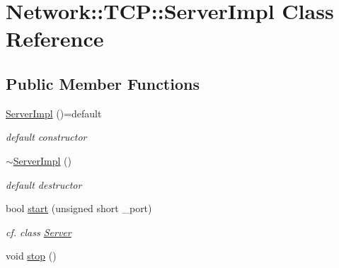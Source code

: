\hypertarget{class_network_1_1_t_c_p_1_1_server_impl}{}\section{Network\+:\+:T\+CP\+:\+:Server\+Impl Class Reference}
\label{class_network_1_1_t_c_p_1_1_server_impl}
\subsection*{Public Member Functions}
\begin{DoxyCompactItemize}
\item 
\mbox{\label{class_network_1_1_t_c_p_1_1_server_impl_a403326bc1862f1666931d7552e5d73dd}} 
\hyperlink{class_network_1_1_t_c_p_1_1_server_impl_a403326bc1862f1666931d7552e5d73dd}{Server\+Impl} ()=default
\begin{DoxyCompactList}\small\item\em default constructor \end{DoxyCompactList}\item 
\mbox{\label{class_network_1_1_t_c_p_1_1_server_impl_a5f24accaf0c35e6bca1944310d6d365b}} 
\hyperlink{class_network_1_1_t_c_p_1_1_server_impl_a5f24accaf0c35e6bca1944310d6d365b}{$\sim$\+Server\+Impl} ()
\begin{DoxyCompactList}\small\item\em default destructor \end{DoxyCompactList}\item 
\mbox{\label{class_network_1_1_t_c_p_1_1_server_impl_af5bb3160db4da70211389a63294432da}} 
bool \hyperlink{class_network_1_1_t_c_p_1_1_server_impl_af5bb3160db4da70211389a63294432da}{start} (unsigned short \+\_\+port)
\begin{DoxyCompactList}\small\item\em cf. class \hyperlink{class_network_1_1_t_c_p_1_1_server}{Server} \end{DoxyCompactList}\item 
\mbox{\label{class_network_1_1_t_c_p_1_1_server_impl_ae8f77df483436b7ff6eef716e90ac3ee}} 
void \hyperlink{class_network_1_1_t_c_p_1_1_server_impl_ae8f77df483436b7ff6eef716e90ac3ee}{stop} ()

\end{DoxyCompactItemize}
